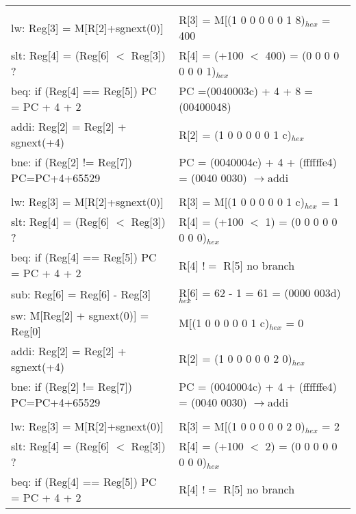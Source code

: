 \documentclass[11pt]{article}   	%
\begin{document}
\begin{table}[!htbp]
\begin{tabular}{ll}
&\\

lw: Reg[3] = M[R[2]+sgnext(0)]&  R[3] = M[(1 0 0 0 0 0 1 8)$_{hex}$ = 400 \\

slt: Reg[4] = (Reg[6] $<$ Reg[3]) ?& R[4] = (+100 $<$ 400) = (0 0 0 0 0 0 0 1)$_{hex}$\\

beq: if (Reg[4] == Reg[5]) PC = PC + 4 + 2&  PC =(0040003c) + 4 + 8 = (00400048)  \\

addi: Reg[2] = Reg[2] + sgnext(+4) & R[2] = (1 0 0 0 0 0 1 c)$_{hex}$\\

bne: if (Reg[2] != Reg[7]) PC=PC+4+65529 & PC = (0040004c) + 4 + (ffffffe4) = (0040 0030)  $\rightarrow$addi\\

&\\

lw: Reg[3] = M[R[2]+sgnext(0)]&  R[3] = M[(1 0 0 0 0 0 1 c)$_{hex}$ = 1 \\

slt: Reg[4] = (Reg[6] $<$ Reg[3]) ?& R[4] = (+100 $<$ 1) = (0 0 0 0 0 0 0 0)$_{hex}$\\

beq: if (Reg[4] == Reg[5]) PC = PC + 4 + 2& R[4] $!=$ R[5]  no branch\\

sub: Reg[6] = Reg[6] - Reg[3]& R[6] = 62 - 1 = 61 = (0000 003d)$_{hex}$\\

sw: M[Reg[2] + sgnext(0)] = Reg[0]& M[(1 0 0 0 0 0 1 c)$_{hex}$ = 0\\

addi: Reg[2] = Reg[2] + sgnext(+4) & R[2] = (1 0 0 0 0 0 2 0)$_{hex}$\\

bne: if (Reg[2] != Reg[7]) PC=PC+4+65529 & PC = (0040004c) + 4 + (ffffffe4) = (0040 0030)  $\rightarrow$addi\\

&\\

lw: Reg[3] = M[R[2]+sgnext(0)]&  R[3] = M[(1 0 0 0 0 0 2 0)$_{hex}$ = 2 \\

slt: Reg[4] = (Reg[6] $<$ Reg[3]) ?& R[4] = (+100 $<$ 2) = (0 0 0 0 0 0 0 0)$_{hex}$\\

beq: if (Reg[4] == Reg[5]) PC = PC + 4 + 2& R[4] $!=$ R[5]  no branch\\


\end{tabular}
\end{table}
\end{document}
